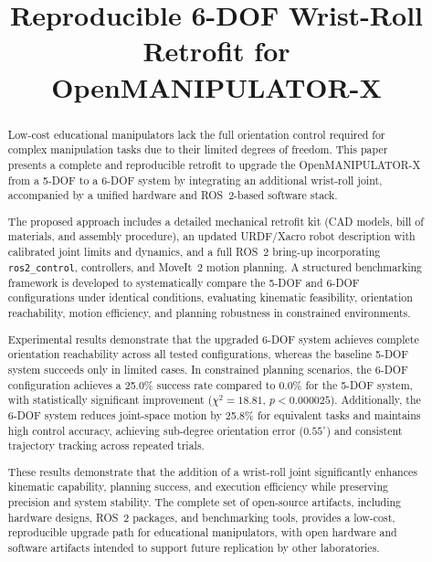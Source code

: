 \documentclass[conference]{IEEEtran}
\title{Reproducible 6-DOF Wrist-Roll Retrofit for OpenMANIPULATOR-X}
\author{
	\IEEEauthorblockA{
		CSE/ROBOTICS\\
		TELEPARADIGM TOWERS\\
		HYDERABAD, INDIA\\
		email@domain.com}
}
\begin{document}
	
	\maketitle
	
	\begin{abstract}
		Low-cost educational manipulators lack the full orientation control
		required for complex manipulation tasks due to their limited degrees
		of freedom. This paper presents a complete and reproducible retrofit
		to upgrade the OpenMANIPULATOR-X from a 5-DOF to a
		6-DOF system by integrating an additional wrist-roll joint, accompanied
		by a unified hardware and ROS~2-based software stack.
		
		The proposed approach includes a detailed mechanical retrofit kit
		(CAD models, bill of materials, and assembly procedure), an updated
		URDF/Xacro robot description with calibrated joint limits and
		dynamics, and a full ROS~2 bring-up incorporating
		\texttt{ros2\_control}, controllers, and MoveIt~2 motion planning.
		A structured benchmarking framework is developed to systematically
		compare the 5-DOF and 6-DOF configurations under identical
		conditions, evaluating kinematic feasibility, orientation
		reachability, motion efficiency, and planning robustness in
		constrained environments.
		
		Experimental results demonstrate that the upgraded 6-DOF system
		achieves complete orientation reachability across all tested
		configurations, whereas the baseline 5-DOF system succeeds only
		in limited cases. In constrained planning scenarios, the 6-DOF
		configuration achieves a 25.0\% success rate compared to 0.0\%
		for the 5-DOF system, with statistically significant improvement
		($\chi^2 = 18.81$, $p < 0.000025$). Additionally, the 6-DOF
		system reduces joint-space motion by 25.8\% for equivalent tasks
		and maintains high control accuracy, achieving sub-degree
		orientation error ($0.55^\circ$) and consistent trajectory
		tracking across repeated trials.
		
		These results demonstrate that the addition of a wrist-roll joint
		significantly enhances kinematic capability, planning success, and
		execution efficiency while preserving precision and system
		stability. The complete set of open-source artifacts, including
		hardware designs, ROS~2 packages, and benchmarking tools,
		provides a low-cost, reproducible upgrade path for educational
		manipulators, with open hardware and software artifacts intended
		to support future replication by other laboratories.
	\end{abstract}
	
\end{document}
